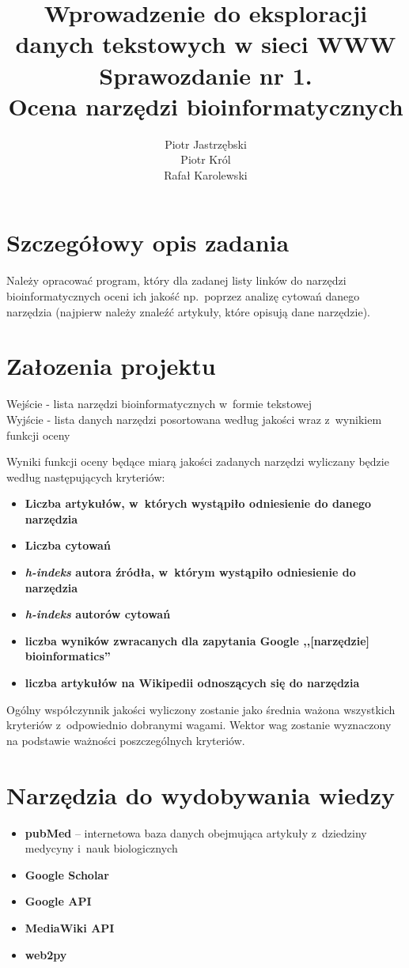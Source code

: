 \documentclass[11pt,a4paper]{article}
\title{Wprowadzenie do eksploracji danych tekstowych w sieci WWW\\ Sprawozdanie nr 1.\\ \large Ocena narzędzi bioinformatycznych}
\author{Piotr Jastrzębski\\ Piotr Król \\ Rafał Karolewski}
\date{}
\begin{document}
\maketitle

\section{Szczegółowy opis zadania}\label{opis}
Należy opracować program, który dla zadanej listy linków do narzędzi bioinformatycznych oceni ich jakość np.~poprzez analizę cytowań danego narzędzia (najpierw należy znaleźć artykuły, które opisują dane narzędzie).

\section{Załozenia projektu}

Wejście - lista narzędzi bioinformatycznych w~formie tekstowej\\
Wyjście - lista danych narzędzi posortowana według jakości wraz z~wynikiem funkcji oceny

Wyniki funkcji oceny będące miarą jakości zadanych narzędzi wyliczany będzie według następujących kryteriów:
\begin{itemize}
	\item \textbf{Liczba artykułów, w~których wystąpiło odniesienie do danego narzędzia}
	\item \textbf{Liczba cytowań}
	\item \textbf{\emph{h-indeks} autora źródła, w~którym wystąpiło odniesienie do narzędzia }
	\item \textbf{\emph{h-indeks} autorów cytowań}
	\item \textbf{liczba wyników zwracanych dla zapytania Google ,,[narzędzie] bioinformatics''}
	\item \textbf{liczba artykułów na Wikipedii odnoszących się do narzędzia}
\end{itemize}

Ogólny współczynnik jakości wyliczony zostanie jako średnia ważona wszystkich kryteriów z~odpowiednio dobranymi wagami. Wektor wag zostanie wyznaczony na podstawie ważności poszczególnych kryteriów.

\section{Narzędzia do wydobywania wiedzy}

\begin{itemize}
\item \textbf{pubMed} --  internetowa baza danych obejmująca artykuły z~dziedziny medycyny i~nauk biologicznych \cite{pubmed}
\item \textbf{Google Scholar} \cite{scholar}
\item \textbf{Google API} \cite{googleApi}
\item \textbf{MediaWiki API} \cite{mediaWiki}
\item \textbf{web2py} \cite{web2py}
\end{itemize}
\end{document}
